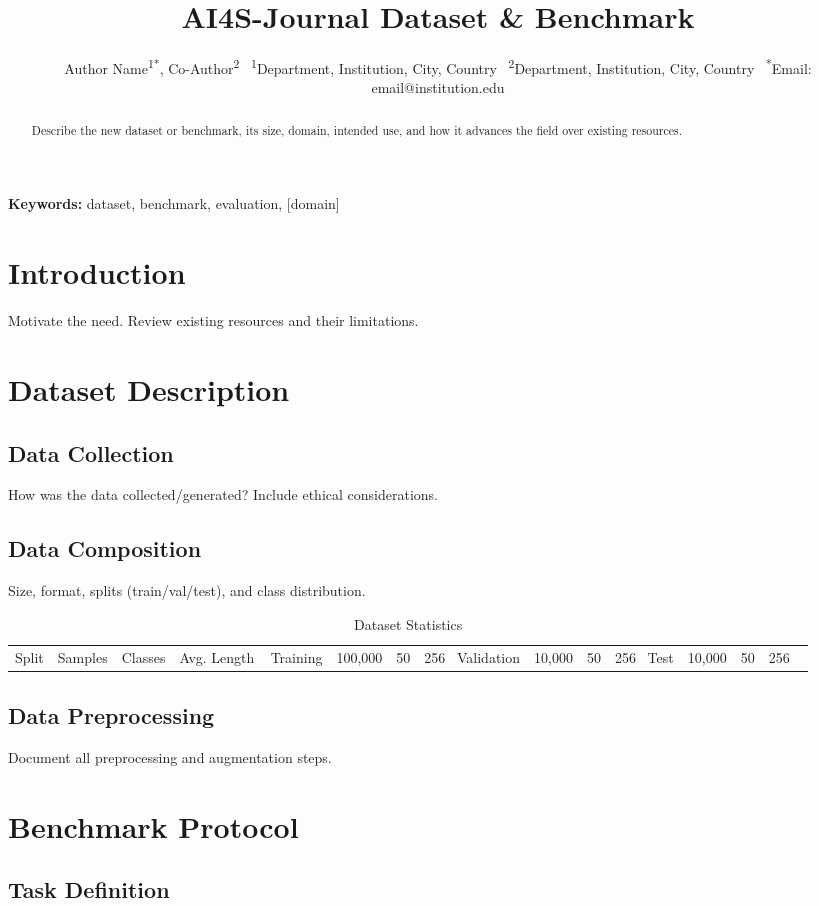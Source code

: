 \documentclass[12pt,a4paper]{article}
\title{\textbf{\textcolor{ai4sgold}{AI4S-Journal} Dataset \& Benchmark}}
\author{Author Name\textsuperscript{1*}, Co-Author\textsuperscript{2} \
\textsuperscript{1}Department, Institution, City, Country \
\textsuperscript{2}Department, Institution, City, Country \
\textsuperscript{*}Email: email@institution.edu}
\date{}
\begin{document}
\maketitle

\begin{abstract}
Describe the new dataset or benchmark, its size, domain, intended use, and
how it advances the field over existing resources.
\end{abstract}
\noindent\textbf{Keywords:} dataset, benchmark, evaluation, [domain]

\section{Introduction}
Motivate the need. Review existing resources and their limitations.

\section{Dataset Description}
\subsection{Data Collection}
How was the data collected/generated? Include ethical considerations.
\subsection{Data Composition}
Size, format, splits (train/val/test), and class distribution.

\begin{table}[h]
\centering
\caption{Dataset Statistics}
\begin{tabular}{@{}lrrr@{}}
\toprule
Split & Samples & Classes & Avg. Length \
\midrule
Training   & 100,000 & 50 & 256 \
Validation &  10,000 & 50 & 256 \
Test       &  10,000 & 50 & 256 \
\bottomrule
\end{tabular}
\end{table}

\subsection{Data Preprocessing}
Document all preprocessing and augmentation steps.

\section{Benchmark Protocol}
\subsection{Task Definition}
\end{document}
